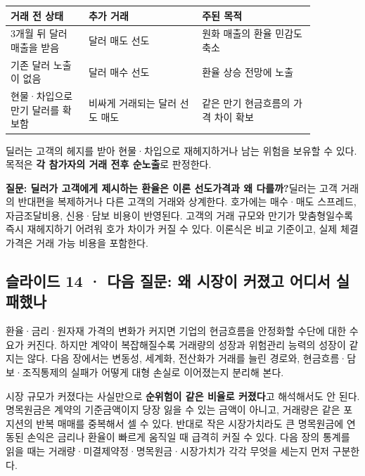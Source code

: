 \documentclass[11pt,a4paper]{article}
\begin{document}
\begin{center}\small\begin{tabular}{p{0.22\linewidth}p{0.32\linewidth}p{0.32\linewidth}}\hline
거래 전 상태 & 추가 거래 & 주된 목적 \\ \hline
3개월 뒤 달러 매출을 받음 & 달러 매도 선도 & 원화 매출의 환율 민감도 축소 \\
기존 달러 노출이 없음 & 달러 매수 선도 & 환율 상승 전망에 노출 \\
현물·차입으로 만기 달러를 확보함 & 비싸게 거래되는 달러 선도 매도 & 같은 만기 현금흐름의 가격 차이 확보 \\
\hline\end{tabular}\end{center}\normalsize

딜러는 고객의 헤지를 받아 현물·차입으로 재헤지하거나 남는 위험을 보유할 수 있다. 목적은 \textbf{각 참가자의 거래 전후 순노출}로 판정한다.\par

\par\medskip\noindent\textbf{질문: 딜러가 고객에게 제시하는 환율은 이론 선도가격과 왜 다를까?}\quad 딜러는 고객 거래의 반대편을 복제하거나 다른 고객의 거래와 상계한다. 호가에는 매수·매도 스프레드, 자금조달비용, 신용·담보 비용이 반영된다. 고객의 거래 규모와 만기가 맞춤형일수록 즉시 재헤지하기 어려워 호가 차이가 커질 수 있다. 이론식은 비교 기준이고, 실제 체결가격은 거래 가능 비용을 포함한다.\par

\subsection{슬라이드 14 · 다음 질문: 왜 시장이 커졌고 어디서 실패했나}
환율·금리·원자재 가격의 변화가 커지면 기업의 현금흐름을 안정화할 수단에 대한 수요가 커진다. 하지만 계약이 복잡해질수록 거래량의 성장과 위험관리 능력의 성장이 같지는 않다. 다음 장에서는 변동성, 세계화, 전산화가 거래를 늘린 경로와, 현금흐름·담보·조직통제의 실패가 어떻게 대형 손실로 이어졌는지 분리해 본다.\par

시장 규모가 커졌다는 사실만으로 \textbf{순위험이 같은 비율로 커졌다}고 해석해서도 안 된다. 명목원금은 계약의 기준금액이지 당장 잃을 수 있는 금액이 아니고, 거래량은 같은 포지션의 반복 매매를 중복해서 셀 수 있다. 반대로 작은 시장가치라도 큰 명목원금에 연동된 손익은 금리나 환율이 빠르게 움직일 때 급격히 커질 수 있다. 다음 장의 통계를 읽을 때는 거래량·미결제약정·명목원금·시장가치가 각각 무엇을 세는지 먼저 구분한다.\par
\end{document}
